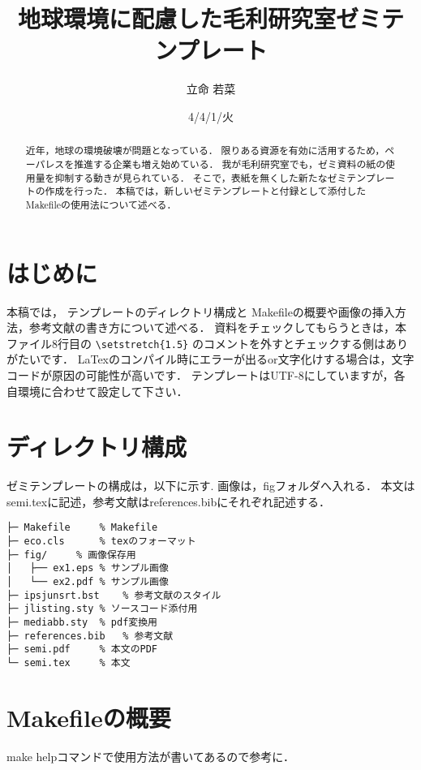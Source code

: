 \documentclass[submit,techreq,noauthor,dvipdfmx]{eco}	%
\begin{document}
\date   {4/4/1/火}				%
\title  {地球環境に配慮した毛利研究室ゼミテンプレート}	%
\author {立命 若菜}				%


\begin{abstract}
	近年，地球の環境破壊が問題となっている．
	限りある資源を有効に活用するため，ペーパレスを推進する企業も増え始めている．
	我が毛利研究室でも，ゼミ資料の紙の使用量を抑制する動きが見られている．
	そこで，表紙を無くした新たなゼミテンプレートの作成を行った．
	本稿では，新しいゼミテンプレートと付録として添付したMakefileの使用法について述べる．
\end{abstract}
\maketitle

\section{はじめに}
本稿では，
テンプレートのディレクトリ構成と
Makefileの概要や画像の挿入方法，参考文献の書き方について述べる．
資料をチェックしてもらうときは，本ファイル8行目の
\verb|\setstretch{1.5}|
のコメントを外すとチェックする側はありがたいです．
LaTexのコンパイル時にエラーが出るor文字化けする場合は，文字コードが原因の可能性が高いです．
テンプレートはUTF-8にしていますが，各自環境に合わせて設定して下さい．


\section{ディレクトリ構成}
ゼミテンプレートの構成は，以下に示す.
画像は，figフォルダへ入れる．
本文はsemi.texに記述，参考文献はreferences.bibにそれぞれ記述する．

\begin{lstlisting}
├─ Makefile		% Makefile
├─ eco.cls		% texのフォーマット
├─ fig/		% 画像保存用
│   ├── ex1.eps	% サンプル画像
│   └── ex2.pdf	% サンプル画像
├─ ipsjunsrt.bst	% 参考文献のスタイル
├─ jlisting.sty	% ソースコード添付用
├─ mediabb.sty 	% pdf変換用
├─ references.bib	% 参考文献
├─ semi.pdf		% 本文のPDF
└─ semi.tex		% 本文
\end{lstlisting}

\section{Makefileの概要}
make helpコマンドで使用方法が書いてあるので参考に．
\end{document}
